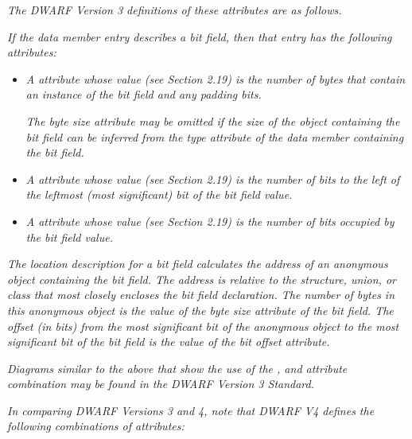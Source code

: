 \textit{The DWARF Version 3 definitions of these attributes are
as follows.}

\begin{myindentpara}{1cm}
\textit{If the data member entry describes a bit field, then that
entry has the following attributes:}

\begin{itemize}
\item \textit{A  attribute whose value (see Section
2.19) is the number of bytes that contain an instance of the
bit field and any padding bits.}

\textit{The byte size attribute may be omitted if the size of the
object containing the bit field can be inferred from the type
attribute of the data member containing the bit field.}

\item \textit{A  attribute whose value (see Section
2.19) is the number of bits to the left of the leftmost
(most significant) bit of the bit field value.}

\item \textit{A  attribute whose value (see Section
2.19) is the number of bits occupied by the bit field value.}

\end{itemize}

\textit{The location description for a bit field calculates the address
of an anonymous object containing the bit field. The address
is relative to the structure, union, or class that most closely
encloses the bit field declaration. The number of bytes in this
anonymous object is the value of the byte size attribute of
the bit field. The offset (in bits) from the most significant
bit of the anonymous object to the most significant bit of
the bit field is the value of the bit offset attribute.}
\end{myindentpara}


\textit{Diagrams similar to the above that show the use of the
,  and  attribute
combination may be found in the DWARF Version 3 Standard.}

\textit{In comparing DWARF Versions 3 and 4, note that DWARF V4
defines the following combinations of attributes:}

